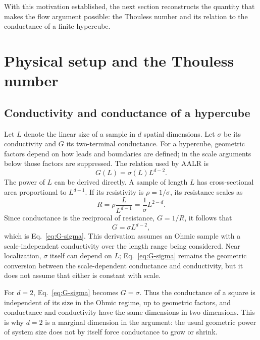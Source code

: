 \documentclass[11pt,a4paper]{article}
\numberwithin{equation}{section}
\begin{document}
With this motivation established, the next section reconstructs the
quantity that makes the flow argument possible: the Thouless number and
its relation to the conductance of a finite hypercube.

\section{Physical setup and the Thouless number}

\subsection{Conductivity and conductance of a hypercube}

Let $L$ denote the linear size of a sample in $d$ spatial dimensions. Let $\sigma$ be its conductivity and $G$ its two-terminal conductance. For a hypercube, geometric factors depend on how leads and boundaries are defined; in the scale arguments below those factors are suppressed. The relation used by AALR is
\begin{equation}
    G(L) = \sigma(L) L^{d-2}.
    \label{eq:G-sigma}
\end{equation}
The power of $L$ can be derived directly. A sample of length $L$ has cross-sectional area proportional to $L^{d-1}$. If its resistivity is $\rho=1/\sigma$, its resistance scales as
\begin{equation}
    R = \rho\frac{L}{L^{d-1}}
      = \frac{1}{\sigma}L^{2-d}.
\end{equation}
Since conductance is the reciprocal of resistance, $G=1/R$, it follows that
\begin{equation}
    G = \sigma L^{d-2},
\end{equation}
which is Eq.~\eqref{eq:G-sigma}. This derivation assumes an Ohmic sample with a scale-independent conductivity over the length range being considered. Near localization, $\sigma$ itself can depend on $L$; Eq.~\eqref{eq:G-sigma} remains the geometric conversion between the scale-dependent conductance and conductivity, but it does not assume that either is constant with scale.

For $d=2$, Eq.~\eqref{eq:G-sigma} becomes $G=\sigma$. Thus the conductance of a square is independent of its size in the Ohmic regime, up to geometric factors, and conductance and conductivity have the same dimensions in two dimensions. This is why $d=2$ is a marginal dimension in the argument: the usual geometric power of system size does not by itself force conductance to grow or shrink.
\end{document}
